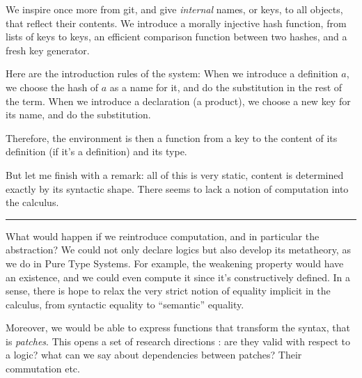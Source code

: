 \documentclass[12pt]{article}
\newcommand{\slide}{\vspace{1em} \hrule \vspace{1em}}
\begin{document}
We inspire once more from \textsf{git}, and give \emph{internal}
names, or keys, to all objects, that reflect their contents. We
introduce a morally injective hash function, from lists of keys to
keys, an efficient comparison function between two hashes, and a fresh
key generator.

Here are the introduction rules of the system: When we introduce a
definition $a$, we choose the hash of $a$ as a name for it, and do the
substitution in the rest of the term. When we introduce a declaration
(a product), we choose a new key for its name, and do the
substitution.

Therefore, the environment is then a function from a key to the
content of its definition (if it's a definition) and its type.

But let me finish with a remark: all of this is very static, content
is determined exactly by its syntactic shape. There seems to lack a
notion of computation into the calculus.

\slide

What would happen if we reintroduce computation, and in particular the
abstraction? We could not only declare logics but also develop its
metatheory, as we do in Pure Type Systems. For example, the weakening
property would have an existence, and we could even compute it since
it's constructively defined. In a sense, there is hope to relax the
very strict notion of equality implicit in the calculus, from
syntactic equality to ``semantic'' equality.

Moreover, we would be able to express functions that transform the
syntax, that is \emph{patches}. This opens a set of research
directions : are they valid with respect to a logic? what can we say
about dependencies between patches? Their commutation etc.
\end{document}
